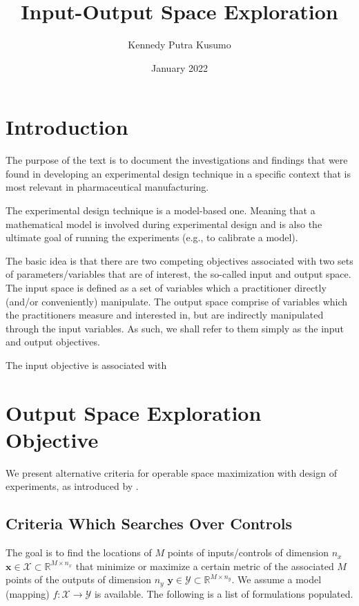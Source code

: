\documentclass{article}
\title{Input-Output Space Exploration}
\author{Kennedy Putra Kusumo}
\date{January 2022}
\begin{document}
	\maketitle
	
	\section{Introduction}
	The purpose of the text is to document the investigations and findings that were found in developing an experimental design technique in a specific context that is most relevant in pharmaceutical manufacturing.
	
	The experimental design technique is a model-based one. Meaning that a mathematical model is involved during experimental design and is also the ultimate goal of running the experiments (e.g., to calibrate a model).
	
	The basic idea is that there are two competing objectives associated with two sets of parameters/variables that are of interest, the so-called input and output space. The input space is defined as a set of variables which a practitioner directly (and/or conveniently) manipulate. The output space comprise of variables which the practitioners measure and interested in, but are indirectly manipulated through the input variables. As such, we shall refer to them simply as the input and output objectives.
	
	The input objective is associated with 
	
	\section{Output Space Exploration Objective}
	We present alternative criteria for operable space maximization with design of experiments, as introduced by \citet{Chen2018}.
	
	\subsection{Criteria Which Searches Over Controls}
	The goal is to find the locations of $M$ points of inputs/controls of dimension $n_x$ $\mathbf{x} \in \mathcal{X} \subset \mathbb{R}^{M \times n_x}$ that minimize or maximize a certain metric of the associated $M$ points of the outputs of dimension $n_y$ $\mathbf{y} \in \mathcal{Y} \subset \mathbb{R}^{M \times n_y}$. We assume a model (mapping) $f:\mathcal{X} \rightarrow \mathcal{Y}$ is available. The following is a list of formulations populated.
	
\end{document}
